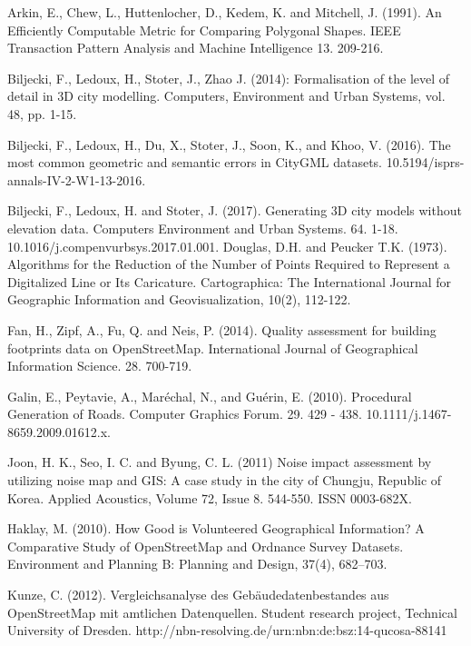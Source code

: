 \documentclass{kththesis}
\begin{document}
\begin{thebibliography}{9}

Arkin, E., Chew, L., Huttenlocher, D., Kedem, K. and Mitchell, J. (1991). An Efficiently Computable Metric for Comparing Polygonal Shapes. IEEE Transaction Pattern Analysis and Machine Intelligence 13. 209-216.

Biljecki, F., Ledoux, H., Stoter, J., Zhao J. (2014): Formalisation of the level of detail in 3D city modelling. Computers, Environment and Urban Systems, vol. 48, pp. 1-15.

Biljecki, F., Ledoux, H., Du, X., Stoter, J., Soon, K., and Khoo, V. (2016). The most common geometric and semantic errors in CityGML datasets. 10.5194/isprs-annals-IV-2-W1-13-2016. 

Biljecki, F., Ledoux, H. and Stoter, J. (2017). Generating 3D city models without elevation data. Computers Environment and Urban Systems. 64. 1-18. 10.1016/j.compenvurbsys.2017.01.001. 
Douglas, D.H. and Peucker T.K. (1973). Algorithms for the Reduction of the Number of Points Required to Represent a Digitalized Line or Its Caricature. Cartographica: The International Journal for Geographic Information and Geovisualization, 10(2), 112-122.

Fan, H., Zipf, A., Fu, Q. and Neis, P. (2014). Quality assessment for building footprints data on OpenStreetMap. International Journal of Geographical Information Science. 28. 700-719.

Galin, E., Peytavie, A., Maréchal, N., and Guérin, E. (2010). Procedural Generation of Roads. Computer Graphics Forum. 29. 429 - 438. 10.1111/j.1467-8659.2009.01612.x. 

Joon, H. K., Seo, I. C. and Byung, C. L. (2011) Noise impact assessment by utilizing noise map and GIS: A case study in the city of Chungju, Republic of Korea. Applied Acoustics, Volume 72, Issue 8. 544-550. ISSN 0003-682X.

Haklay, M. (2010). How Good is Volunteered Geographical Information? A Comparative Study of OpenStreetMap and Ordnance Survey Datasets. Environment and Planning B: Planning and Design, 37(4), 682–703.

Kunze, C. (2012). Vergleichsanalyse des Gebäudedatenbestandes aus OpenStreetMap mit amtlichen Datenquellen. Student research project, Technical University of Dresden. http://nbn-resolving.de/urn:nbn:de:bsz:14-qucosa-88141


\end{thebibliography}
\end{document}
